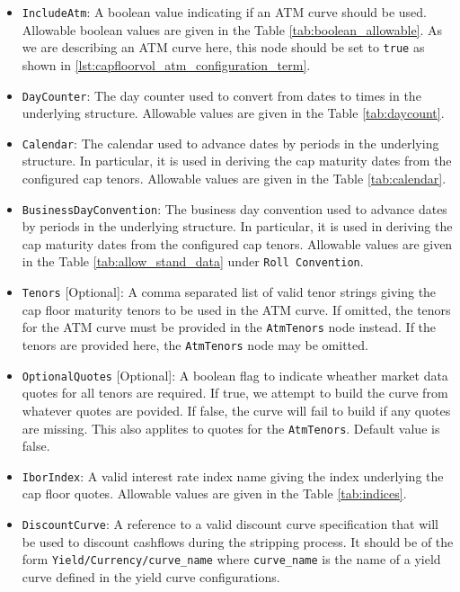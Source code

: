 \begin{itemize}
\item \lstinline!IncludeAtm!:
A boolean value indicating if an ATM curve should be used. Allowable boolean values are given in the Table \ref{tab:boolean_allowable}. As we are describing an ATM curve here, this node should be set to \lstinline!true! as shown in \ref{lst:capfloorvol_atm_configuration_term}.

\item \lstinline!DayCounter!:
The day counter used to convert from dates to times in the underlying structure. Allowable values are given in the Table \ref{tab:daycount}.

\item \lstinline!Calendar!:
The calendar used to advance dates by periods in the underlying structure. In particular, it is used in deriving the cap maturity dates from the configured cap tenors. Allowable values are given in the Table \ref{tab:calendar}.

\item \lstinline!BusinessDayConvention!:
The business day convention used to advance dates by periods in the underlying structure. In particular, it is used in deriving the cap maturity dates from the configured cap tenors. Allowable values are given in the Table \ref{tab:allow_stand_data} under \lstinline!Roll Convention!.

\item \lstinline!Tenors! [Optional]:
A comma separated list of valid tenor strings giving the cap floor maturity tenors to be used in the ATM curve. If omitted, the tenors for the ATM curve must be provided in the \lstinline!AtmTenors! node instead. If the tenors are provided here, the \lstinline!AtmTenors! node may be omitted.

\item \lstinline!OptionalQuotes! [Optional]:
A boolean flag to indicate wheather market data quotes for all tenors are required. If true, we attempt to build the curve from whatever quotes are povided. If false, the curve will fail to build if any quotes are missing. This also applites to quotes for the \lstinline!AtmTenors!. Default value is false.

\item \lstinline!IborIndex!:
A valid interest rate index name giving the index underlying the cap floor quotes. Allowable values are given in the Table \ref{tab:indices}.

\item \lstinline!DiscountCurve!:
A reference to a valid discount curve specification that will be used to discount cashflows during the stripping process. It should be of the form \lstinline!Yield/Currency/curve_name! where \lstinline!curve_name! is the name of a yield curve defined in the yield curve configurations.


\end{itemize}
